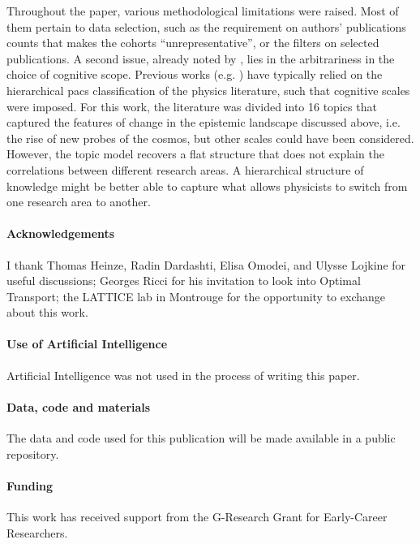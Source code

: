 \documentclass{article}
\begin{document}
Throughout the paper, various methodological limitations were raised. Most of them pertain to data selection, such as the requirement on authors' publications counts that makes the cohorts ``unrepresentative'', or the filters on selected publications. A second issue, already noted by \citet{Gieryn1978}, lies in the arbitrariness in the choice of cognitive scope. Previous works (e.g. \citealt{Tripodi2020,Aleta2019,Battiston2019,Jia2017}) have typically relied on the hierarchical \gls{pacs} classification of the physics literature, such that cognitive scales were imposed. For this work, the literature was divided into 16 topics that captured the features of change in the epistemic landscape discussed above, i.e. the rise of new probes of the cosmos, but other scales could have been considered. However, the topic model recovers a flat structure that does not explain the correlations between different research areas. A hierarchical structure of knowledge might be better able to capture what allows physicists to switch from one research area to another. %

\endgroup

\paragraph{Acknowledgements}{I thank Thomas Heinze, Radin Dardashti, Elisa Omodei, and Ulysse Lojkine for useful discussions; Georges Ricci for his invitation to look into Optimal Transport; the LATTICE lab in Montrouge for the opportunity to exchange about this work.}



\paragraph{Use of Artificial Intelligence}{Artificial Intelligence was not used in the process of writing this paper.}

\paragraph{Data, code and materials}{The data and code used for this publication will be made available in a public repository.}

\paragraph{Funding}{This work has received support from the G-Research Grant for Early-Career Researchers.}
\end{document}
